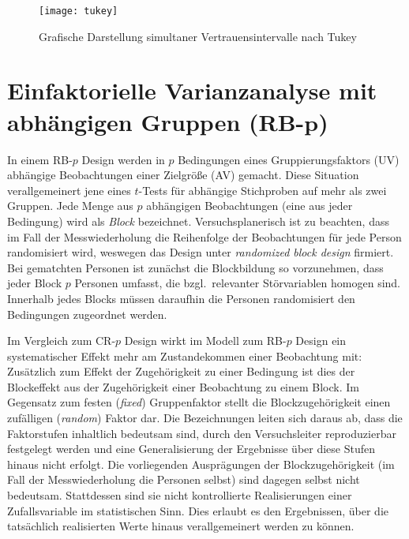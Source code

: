 \begin{figure}[ht]
\centering
\texttt{[image: tukey]}
\vspace*{-0.5em}
\caption{Grafische Darstellung simultaner Vertrauensintervalle nach Tukey}
\label{fig:tukey}
\end{figure}

\section[Einfaktorielle Varianzanalyse mit abhängigen Gruppen (RB-\texorpdfstring{$p$}{p})]{Einfaktorielle Varianzanalyse mit abhängigen Gruppen (RB-$\bm{p}$)}
\label{sec:RBp}

In einem RB-$p$ Design werden in $p$ Bedingungen eines Gruppierungsfaktors (UV) abhängige Beobachtungen einer Zielgröße (AV) gemacht. Diese Situation verallgemeinert jene eines $t$-Tests für abhängige Stichproben auf mehr als zwei Gruppen. Jede Menge aus $p$ abhängigen Beobachtungen (eine aus jeder Bedingung) wird als \emph{Block} bezeichnet. Versuchsplanerisch ist zu beachten, dass im Fall der Messwiederholung die Reihenfolge der Beobachtungen für jede Person randomisiert wird, weswegen das Design unter \emph{randomized block design} firmiert. Bei gematchten Personen ist zunächst die Blockbildung so vorzunehmen, dass jeder Block $p$ Personen umfasst, die bzgl.\ relevanter Störvariablen homogen sind. Innerhalb jedes Blocks müssen daraufhin die Personen randomisiert den Bedingungen zugeordnet werden.

Im Vergleich zum CR-$p$ Design wirkt im Modell zum RB-$p$ Design ein systematischer Effekt mehr am Zustandekommen einer Beobachtung mit: Zusätzlich zum Effekt der Zugehörigkeit zu einer Bedingung ist dies der Blockeffekt aus der Zugehörigkeit einer Beobachtung zu einem Block. Im Gegensatz zum festen (\emph{fixed}) Gruppenfaktor stellt die Blockzugehörigkeit einen zufälligen (\emph{random}) Faktor dar. Die Bezeichnungen leiten sich daraus ab, dass die Faktorstufen inhaltlich bedeutsam sind, durch den Versuchsleiter reproduzierbar festgelegt werden und eine Generalisierung der Ergebnisse über diese Stufen hinaus nicht erfolgt. Die vorliegenden Ausprägungen der Blockzugehörigkeit (im Fall der Messwiederholung die Personen selbst) sind dagegen selbst nicht bedeutsam. Stattdessen sind sie nicht kontrollierte Realisierungen einer Zufallsvariable im statistischen Sinn. Dies erlaubt es den Ergebnissen, über die tatsächlich realisierten Werte hinaus verallgemeinert werden zu können.

